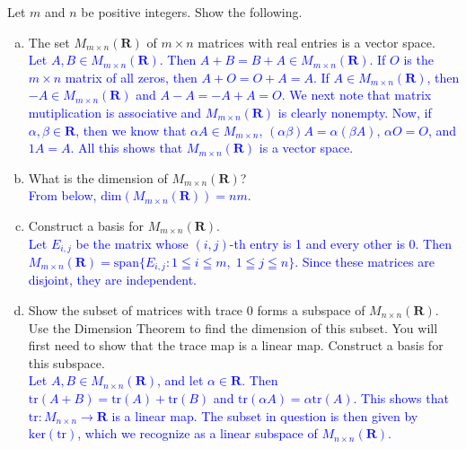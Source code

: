 \documentclass[a4paper,11pt]{article}
\newcommand{\R}{\mathbf{R}}
\newcommand{\ddim}{\text{dim}}
\newcommand{\BB}[1]{\textcolor{blue}{#1}}
\newcommand{\tr}{\text{tr}}
\begin{document}
 Let $m$ and $n$ be positive integers. Show the
following.
\begin{enumerate}[(a)]
\item The set $M_{m \times n}(\R)$ of $m \times n$ matrices with real entries is
  a vector space. \\

  \BB{Let $A,B \in M_{m \times n}(\R)$. Then $A+B=B+A \in M_{m \times n}(\R)$.
    If $O$ is the $m \times n$ matrix of all zeros, then $A+O=O+A=A$. If $A \in
    M_{m \times n}(\R)$, then $-A \in M_{m \times n}(\R)$ and $A-A=-A+A=O$. We
    next note that matrix mutiplication is associative and $M_{m \times n}(\R)$
    is clearly nonempty. Now, if $\alpha,\beta \in \R$, then we know that
    $\alpha A \in M_{m \times n}$, $(\alpha\beta)A=\alpha(\beta A)$, $\alpha O =
    O$, and $1 A = A$. All this shows that $M_{m \times n}(\R)$ is a vector
    space. \\}

\item What is the dimension of $M_{m \times n}(\R)$? \\

  \BB{From below, $\ddim(M_{m \times n}(\R))=nm$. \\}
  
\item Construct a basis for $M_{m \times n}(\R)$. \\

  \BB{Let $E_{i,j}$ be the matrix whose $(i,j)$-th entry is 1 and every other is
    0. Then $M_{m \times n}(\R)=\text{span}\{E_{i,j} : 1 \leqq i \leqq m,\; 1
    \leqq j \leqq n\}$. Since these matrices are disjoint, they are independent.
    \\}

\item Show the subset of matrices with trace 0 forms a subspace of $M_{n \times
    n}(\R)$. Use the Dimension Theorem to find the dimension of this subset. You
  will first need to show that the trace map is a linear map. Construct a basis
  for this subspace. \\

  \BB{Let $A,B \in M_{n \times n}(\R)$, and let $\alpha \in \R$. Then
    $\tr(A+B)=\tr(A)+\tr(B)$ and $\tr(\alpha A)=\alpha\tr(A)$. This shows
    that $\tr : M_{n \times n} \rightarrow \R$ is a linear map. The subset in
    question is then given by $\text{ker}(\tr)$, which we recognize as a linear
    subspace of $M_{n \times n}(\R)$.}


\end{enumerate}
\end{document}
